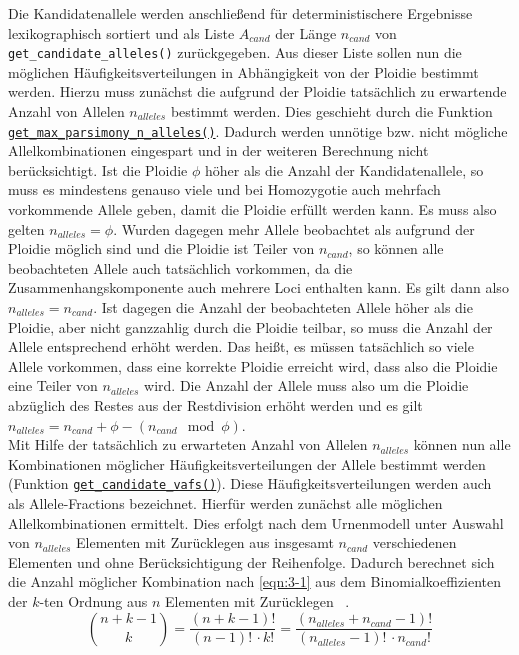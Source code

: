 Die Kandidatenallele werden anschließend für deterministischere Ergebnisse lexikographisch sortiert und als Liste $ A_{cand} $ der Länge $ n_{cand} $ von \lstinline|get_candidate_alleles()| zurückgegeben. Aus dieser Liste sollen nun die möglichen Häufigkeitsverteilungen in Abhängigkeit von der Ploidie bestimmt werden. Hierzu muss zunächst die aufgrund der Ploidie tatsächlich zu erwartende Anzahl von Allelen $n_{alleles}$ bestimmt werden. Dies geschieht durch die Funktion \hyperref[schritt7]{\lstinline|get_max_parsimony_n_alleles()|\label{schritt7txt}}. Dadurch werden unnötige bzw. nicht mögliche Allelkombinationen eingespart und in der weiteren Berechnung nicht berücksichtigt. Ist die Ploidie $ \phi $ höher als die Anzahl der Kandidatenallele, so muss es mindestens genauso viele und bei Homozygotie auch mehrfach vorkommende Allele geben, damit die Ploidie erfüllt werden kann. Es muss also gelten $ n_{alleles} = \phi $. Wurden dagegen mehr Allele beobachtet als aufgrund der Ploidie möglich sind und die Ploidie ist Teiler von $n_{cand}$, so können alle beobachteten Allele auch tatsächlich vorkommen, da die Zusammenhangskomponente auch mehrere Loci enthalten kann. Es gilt dann also $ n_{alleles} = n_{cand} $. Ist dagegen die Anzahl der beobachteten Allele höher als die Ploidie, aber nicht ganzzahlig durch die Ploidie teilbar, so muss die Anzahl der Allele entsprechend erhöht werden. Das heißt, es müssen tatsächlich so viele Allele vorkommen, dass eine korrekte Ploidie erreicht wird, dass also die Ploidie eine Teiler von $ n_{alleles} $ wird. Die Anzahl der Allele muss also um die Ploidie abzüglich des Restes aus der Restdivision erhöht werden und es gilt $ n_{alleles} = n_{cand} + \phi - (n_{cand} \mod \phi)$. \\

Mit Hilfe der tatsächlich zu erwarteten Anzahl von Allelen $ n_{alleles} $ können nun alle Kombinationen möglicher Häufigkeitsverteilungen der Allele bestimmt werden (Funktion \hyperref[schritt8]{\lstinline|get_candidate_vafs()|\label{schritt8txt}}). Diese Häufigkeitsverteilungen werden auch als Allele-Fractions bezeichnet. Hierfür werden zunächst alle möglichen Allelkombinationen ermittelt. Dies erfolgt nach dem Urnenmodell unter Auswahl von $ n_{alleles} $ Elementen mit Zurücklegen aus insgesamt $ n_{cand} $ verschiedenen Elementen und ohne Berücksichtigung der Reihenfolge. Dadurch berechnet sich die Anzahl möglicher Kombination nach \eqref{eqn:3-1} aus dem  Binomialkoeffizienten der $k$-ten Ordnung aus $ n $ Elementen mit Zurücklegen ~\cite{tb_stat,bronst}.
\begin{equation} \label{eqn:3-1}
\tag{3-1}
\binom{n + k - 1}{k} = \frac{(n+k-1)!}{(n-1)!\, \cdotp k!} = \frac{(n_{alleles}+n_{cand}-1)!}{(n_{alleles}-1)!\, \cdotp n_{cand}!} 
\end{equation}

